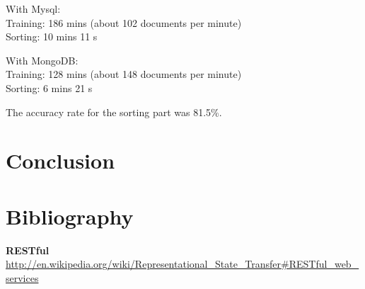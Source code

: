 \documentclass[a4paper,11pt]{article}
\begin{document}
With Mysql:\\
Training: 186 mins (about 102 documents per minute)\\
Sorting: 10 mins 11 s

With MongoDB:\\
Training: 128 mins (about 148 documents per minute)\\
Sorting: 6 mins 21 s

The accuracy rate for the sorting part was 81.5\%.


\section*{Conclusion}



\clearpage
\section*{Bibliography}

\textbf{RESTful} \\
\url{http://en.wikipedia.org/wiki/Representational\_State\_Transfer\#RESTful\_web\_services}
\end{document}
